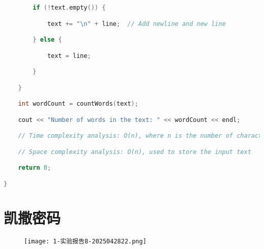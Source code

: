 \begin{lstlisting}[language=C++]
        if (!text.empty()) {

            text += "\n" + line;  // Add newline and new line

        } else {

            text = line;

        }

    }

    int wordCount = countWords(text);

    cout << "Number of words in the text: " << wordCount << endl;

    // Time complexity analysis: O(n), where n is the number of characters in the text

    // Space complexity analysis: O(n), used to store the input text

    return 0;

}
\end{lstlisting}
\section{凯撒密码}

\begin{figure}[H]
\centering
\texttt{[image: 1-实验报告8-2025042822.png]}
\label{}
\end{figure}

